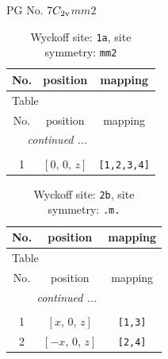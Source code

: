 \documentclass[fleqn,8pt]{jsarticle}
\begin{document}
\setcounter{MaxMatrixCols}{32}

\renewcommand{\tablename}{Table~}
\renewcommand{\figurename}{Figure~}
\begin{center}
\LARGE
PG No. 7\quad$C_{\rm 2v}$\quad$mm2$\quad[ orthorhombic ]
\end{center}
\renewcommand{\arraystretch}{1.2}
\begin{longtable}{ccc}
\caption{Wyckoff site: {\tt 1a}, site symmetry: {\tt mm2}}
 \\
 \hline \hline
No. & position & mapping \\ \hline \endfirsthead

\multicolumn{2}{l}{\tablename\ \thetable{}} \\
 \hline \hline
No. & position & mapping \\ \hline \endhead

 \hline \hline
\multicolumn{2}{r}{\footnotesize\it continued ...} \\ \endfoot

 \hline \hline
\multicolumn{2}{r}{} \\ \endlastfoot

1 & $\left[ 0,\, 0,\, z \right]$ & {\tt [1,2,3,4]} \\
\end{longtable}
\renewcommand{\arraystretch}{1.2}
\begin{longtable}{ccc}
\caption{Wyckoff site: {\tt 2b}, site symmetry: {\tt .m.}}
 \\
 \hline \hline
No. & position & mapping \\ \hline \endfirsthead

\multicolumn{2}{l}{\tablename\ \thetable{}} \\
 \hline \hline
No. & position & mapping \\ \hline \endhead

 \hline \hline
\multicolumn{2}{r}{\footnotesize\it continued ...} \\ \endfoot

 \hline \hline
\multicolumn{2}{r}{} \\ \endlastfoot

1 & $\left[ x,\, 0,\, z \right]$ & {\tt [1,3]} \\ \hline
2 & $\left[ - x,\, 0,\, z \right]$ & {\tt [2,4]} \\
\end{longtable}
\renewcommand{\arraystretch}{1.2}
\end{document}
